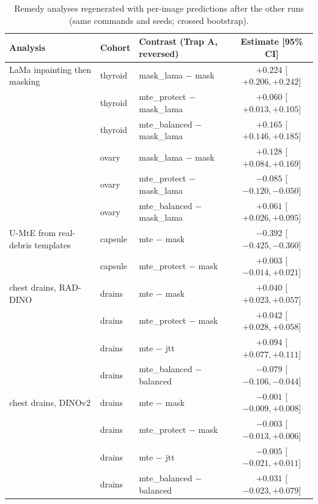 \begin{table}[H]\centering\scriptsize
\caption{Remedy analyses regenerated with per-image predictions after the other runs (same commands and seeds; crossed bootstrap).}\label{tab:regen}
\begin{tabular}{p{4.0cm}p{2.0cm}p{4.4cm}c}\toprule
Analysis & Cohort & Contrast (Trap A, reversed) & Estimate [95\% CI] \\\midrule
LaMa inpainting then masking & thyroid & mask\_lama $-$ mask & $+0.224$ [$+0.206, +0.242$] \\
 & thyroid & mte\_protect $-$ mask\_lama & $+0.060$ [$+0.013, +0.105$] \\
 & thyroid & mte\_balanced $-$ mask\_lama & $+0.165$ [$+0.146, +0.185$] \\
 & ovary & mask\_lama $-$ mask & $+0.128$ [$+0.084, +0.169$] \\
 & ovary & mte\_protect $-$ mask\_lama & $-0.085$ [$-0.120, -0.050$] \\
 & ovary & mte\_balanced $-$ mask\_lama & $+0.061$ [$+0.026, +0.095$] \\
U-MtE from real-debris templates & capsule & mte $-$ mask & $-0.392$ [$-0.425, -0.360$] \\
 & capsule & mte\_protect $-$ mask & $+0.003$ [$-0.014, +0.021$] \\
chest drains, RAD-DINO & drains & mte $-$ mask & $+0.040$ [$+0.023, +0.057$] \\
 & drains & mte\_protect $-$ mask & $+0.042$ [$+0.028, +0.058$] \\
 & drains & mte $-$ jtt & $+0.094$ [$+0.077, +0.111$] \\
 & drains & mte\_balanced $-$ balanced & $-0.079$ [$-0.106, -0.044$] \\
chest drains, DINOv2 & drains & mte $-$ mask & $-0.001$ [$-0.009, +0.008$] \\
 & drains & mte\_protect $-$ mask & $-0.003$ [$-0.013, +0.006$] \\
 & drains & mte $-$ jtt & $-0.005$ [$-0.021, +0.011$] \\
 & drains & mte\_balanced $-$ balanced & $+0.031$ [$-0.023, +0.079$] \\
\bottomrule\end{tabular}
\end{table}
